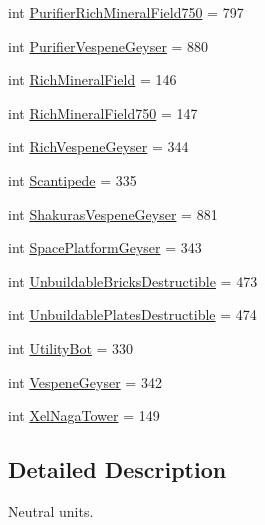 \begin{DoxyCompactItemize}
\item 
int \mbox{\hyperlink{classpysc2_1_1lib_1_1units_1_1_neutral_a0f57f5ece1545db152b1f007bd1c8c2c}{Purifier\+Rich\+Mineral\+Field750}} = 797
\item 
int \mbox{\hyperlink{classpysc2_1_1lib_1_1units_1_1_neutral_a3fa28a1c905bc5def7bc4ab27d670c3a}{Purifier\+Vespene\+Geyser}} = 880
\item 
int \mbox{\hyperlink{classpysc2_1_1lib_1_1units_1_1_neutral_a22bf2bbb65fd4b300bd691a43fcb3267}{Rich\+Mineral\+Field}} = 146
\item 
int \mbox{\hyperlink{classpysc2_1_1lib_1_1units_1_1_neutral_af697f73aaa45b38a12cc4974d367629d}{Rich\+Mineral\+Field750}} = 147
\item 
int \mbox{\hyperlink{classpysc2_1_1lib_1_1units_1_1_neutral_af12044ee001a8ea812a9bc467986bdfa}{Rich\+Vespene\+Geyser}} = 344
\item 
int \mbox{\hyperlink{classpysc2_1_1lib_1_1units_1_1_neutral_ac9718c3189cc9597fdc2a222c8506f54}{Scantipede}} = 335
\item 
int \mbox{\hyperlink{classpysc2_1_1lib_1_1units_1_1_neutral_a8c8deae99120bbecbeef5cc77418e15c}{Shakuras\+Vespene\+Geyser}} = 881
\item 
int \mbox{\hyperlink{classpysc2_1_1lib_1_1units_1_1_neutral_ad5919b3bb0b81202a21a4c51bbecdbfd}{Space\+Platform\+Geyser}} = 343
\item 
int \mbox{\hyperlink{classpysc2_1_1lib_1_1units_1_1_neutral_a21f8b5ae9873d93a3f92ecfa15d44b33}{Unbuildable\+Bricks\+Destructible}} = 473
\item 
int \mbox{\hyperlink{classpysc2_1_1lib_1_1units_1_1_neutral_a45675546ddcf80a426d7e580c4636873}{Unbuildable\+Plates\+Destructible}} = 474
\item 
int \mbox{\hyperlink{classpysc2_1_1lib_1_1units_1_1_neutral_ad0bef92e86c719656fe677020bd92d40}{Utility\+Bot}} = 330
\item 
int \mbox{\hyperlink{classpysc2_1_1lib_1_1units_1_1_neutral_af542249a0900a2dce94cf0661f841fe9}{Vespene\+Geyser}} = 342
\item 
int \mbox{\hyperlink{classpysc2_1_1lib_1_1units_1_1_neutral_a97413685f1a5fd11a88c713ed304c576}{Xel\+Naga\+Tower}} = 149
\end{DoxyCompactItemize}


\subsection{Detailed Description}
\begin{DoxyVerb}Neutral units.\end{DoxyVerb}
 

